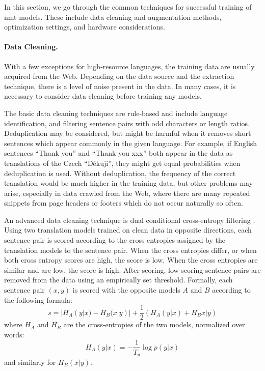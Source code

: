 In this section, we go through the common techniques for successful training of
\ac{nmt} models. These include data cleaning and augmentation methods,
optimization settings, and hardware considerations.

\paragraph{Data Cleaning.} With a few exceptions for high-resource languages,
the training data are usually acquired from the Web. Depending on the data
source and the extraction technique, there is a level of noise present in the
data. In many cases, it is necessary to consider data cleaning before training
any models.

The basic data cleaning techniques are rule-based and include language
identification, and filtering sentence pairs with odd characters or length
ratios. Deduplication may be considered, but might be harmful when it removes
short sentences which appear commonly in the given language. For example, if
English sentences ``Thank you'' and ``Thank you xxx'' both appear in the data
as translations of the Czech ``Děkuji'', they might get equal probabilities
when deduplication is used. Without deduplication, the frequency of the correct
translation would be much higher in the training data, but other problems may
arise, especially in data crawled from the Web, where there are many repeated
snippets from page headers or footers which do not occur naturally so often.

An advanced data cleaning technique is dual conditional cross-entropy filtering
\citep{junczys-dowmunt-2018-dual}. Using two translation models trained on
clean data in opposite directions, each sentence pair is scored according to
the cross entropies assigned by the translation models to the sentence
pair. When the cross entropies differ, or when both cross entropy scores are
high, the score is low. When the cross entropies are similar and are low, the
score is high. After scoring, low-scoring sentence pairs are removed from the
data using an empirically set threshold. Formally, each sentence pair $(x,y)$
is scored with the opposite models $A$ and $B$ according to the following
formula:
%
\begin{equation}
  s = |H_A(y|x) - H_B(x|y)| + \frac{1}{2} (H_A(y|x) + H_B{x|y})
\end{equation}
where $H_A$ and $H_B$ are the cross-entropies of the two models, normalized
over words:
%
\begin{equation}
  H_A(y|x) = - \frac{1}{T_y} \log p(y|x)
\end{equation}
and similarly for $H_B(x|y)$.

